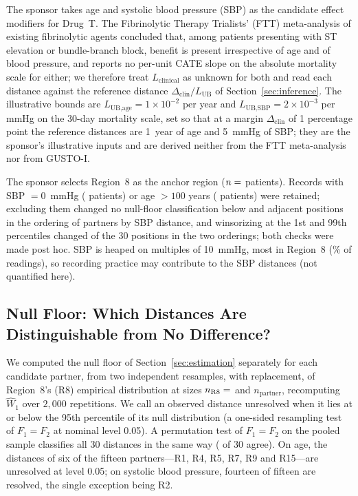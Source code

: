 \documentclass[AMA,Times1COL]{WileyNJDv5}
\begin{document}
The sponsor takes age and systolic blood pressure (SBP) as the candidate effect modifiers for Drug~T. The Fibrinolytic Therapy Trialists' (FTT) meta-analysis of existing fibrinolytic agents\cite{ftt1994} concluded that, among patients presenting with ST elevation or bundle-branch block, benefit is present irrespective of age and of blood pressure, and reports no per-unit CATE slope on the absolute mortality scale for either; we therefore treat $L_{\text{clinical}}$ as unknown for both and read each distance against the reference distance $\Delta_{\text{clin}} / L_{\text{UB}}$ of Section~\ref{sec:inference}. The illustrative bounds are $L_{\text{UB,age}} = 1 \times 10^{-2}$ per year and $L_{\text{UB,SBP}} = 2 \times 10^{-3}$ per mmHg on the 30-day mortality scale, set so that at a margin $\Delta_{\text{clin}}$ of 1 percentage point the reference distances are 1~year of age and 5~mmHg of SBP; they are the sponsor's illustrative inputs and are derived neither from the FTT meta-analysis nor from GUSTO-I.

The sponsor selects Region~8 as the anchor region ($n = \numval{nR8}$ patients). Records with SBP $= 0$~mmHg ( patients) or age $> 100$ years ( patients) were retained; excluding them changed no null-floor classification below and  adjacent positions in the ordering of partners by SBP distance, and winsorizing at the 1st and 99th percentiles changed  of the 30 positions in the two orderings; both checks were made post hoc. SBP is heaped on multiples of 10~mmHg, most in Region~8 (\% of readings), so recording practice may contribute to the SBP distances (not quantified here).


\subsection{Null Floor: Which Distances Are Distinguishable from No Difference?}\label{sec:app_operability}

We computed the null floor of Section~\ref{sec:estimation} separately for each candidate partner, from two independent resamples, with replacement, of Region~8's (R8) empirical distribution at sizes $n_{\text{R8}} = \numval{nR8floor}$ and $n_{\text{partner}}$, recomputing $\widehat{W}_1$ over $2{,}000$ repetitions. %
We call an observed distance unresolved when it lies at or below the 95th percentile of its null distribution (a one-sided resampling test of $F_1 = F_2$ at nominal level 0.05). A permutation test of $F_1 = F_2$ on the pooled sample classifies all 30 distances in the same way ( of 30 agree). On age, the distances of six of the fifteen partners---R1, R4, R5, R7, R9 and R15---are unresolved at level 0.05; on systolic blood pressure, fourteen of fifteen are resolved, the single exception being R2.
\end{document}
